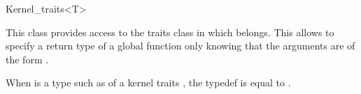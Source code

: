 \begin{ccRefClass}{Kernel_traits<T>}

\ccDefinition

This class provides access to the traits class in which  belongs.
This allows to specify a return type of a global function only knowing that
the arguments are of the form .


\ccTypes

{ When  is a type such as  of a kernel traits ,
the  typedef is equal to . }

\ccTexHtml{\KernelRefLayout}{}
\end{ccRefClass}

